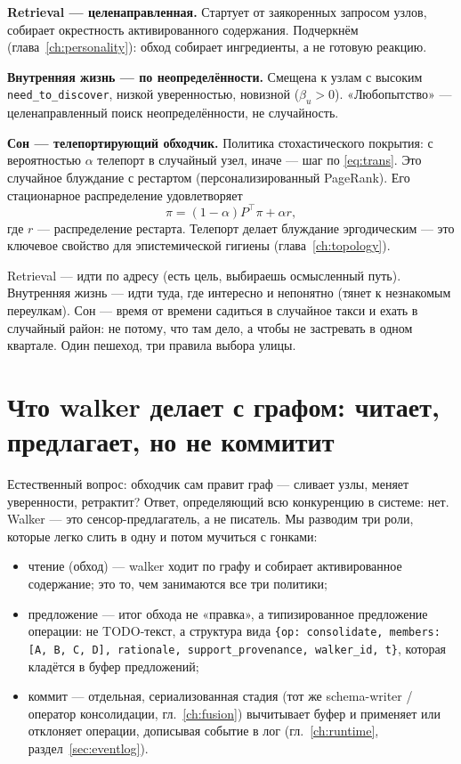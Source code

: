 \smallskip\noindent\textbf{Retrieval --- целенаправленная.}
Стартует от заякоренных запросом узлов, собирает окрестность активированного
содержания. Подчеркнём (глава~\ref{ch:personality}): обход собирает ингредиенты,
а не готовую реакцию.

\smallskip\noindent\textbf{Внутренняя жизнь --- по неопределённости.}
Смещена к узлам с высоким \texttt{need\_to\_discover}, низкой уверенностью,
новизной ($\beta_u > 0$). «Любопытство» --- целенаправленный поиск
неопределённости, не случайность.

\smallskip\noindent\textbf{Сон --- телепортирующий обходчик.}
Политика стохастического покрытия: с вероятностью $\alpha$ телепорт в
случайный узел, иначе --- шаг по \eqref{eq:trans}. Это случайное блуждание с
рестартом (персонализированный PageRank). Его стационарное распределение
удовлетворяет
\begin{equation}
\pi = (1 - \alpha) P^{\top}\pi + \alpha r,
\label{eq:ppr}
\end{equation}
где $r$ --- распределение рестарта. Телепорт делает блуждание эргодическим ---
это ключевое свойство для эпистемической гигиены (глава~\ref{ch:topology}).

\begin{intuition}
Retrieval --- идти по адресу (есть цель, выбираешь осмысленный путь).
Внутренняя жизнь --- идти туда, где интересно и непонятно (тянет к незнакомым
переулкам). Сон --- время от времени садиться в случайное такси и ехать в
случайный район: не потому, что там дело, а чтобы не застревать в одном
квартале. Один пешеход, три правила выбора улицы.
\end{intuition}

\section{Что walker делает с графом: читает, предлагает, но не коммитит}
\label{sec:proposecommit}

Естественный вопрос: обходчик сам правит граф --- сливает узлы, меняет
уверенности, ретрактит? Ответ, определяющий всю конкуренцию в системе: нет.
Walker --- это сенсор-предлагатель, а не писатель. Мы разводим три роли,
которые легко слить в одну и потом мучиться с гонками:
\begin{itemize}
\item чтение (обход) --- walker ходит по графу и собирает активированное
содержание; это то, чем занимаются все три политики;
\item предложение --- итог обхода не «правка», а типизированное предложение
операции: не TODO-текст, а структура вида
\texttt{\{op: consolidate, members:[A, B, C, D], rationale, support\_provenance, walker\_id, t\}},
которая кладётся в буфер предложений;
\item коммит --- отдельная, сериализованная стадия (тот же
schema-writer / оператор консолидации, гл.~\ref{ch:fusion}) вычитывает буфер и
применяет или отклоняет операции, дописывая событие в лог
(гл.~\ref{ch:runtime}, раздел~\ref{sec:eventlog}).
\end{itemize}

